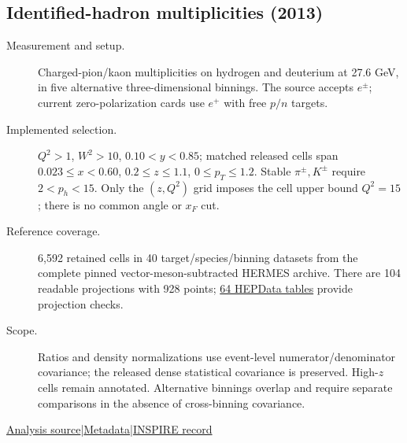 \documentclass[11pt,a4paper]{article}
\newcommand{\id}[1]{{\small\texttt{\detokenize{#1}}}}
\begin{document}
\subsection{\texorpdfstring{Identified-hadron multiplicities (2013)}{Identified-hadron multiplicities (2013)}}
\id{HERMES_2013_I1208547}\quad\cite{r1208547}
\begin{description}
\item[Measurement and setup.] Charged-pion/kaon multiplicities on hydrogen and deuterium at 27.6 GeV, in five alternative three-dimensional binnings. The source accepts $e^\pm$; current zero-polarization cards use $e^+$ with free $p/n$ targets.
\item[Implemented selection.] $Q^2>1$, $W^2>10$, $0.10<y<0.85$; matched released cells span $0.023\le x<0.60$, $0.2\le z\le1.1$, $0\le p_T\le1.2$. Stable $\pi^\pm,K^\pm$ require $2<p_h<15$. Only the $(z,Q^2)$ grid imposes the cell upper bound $Q^2=15$; there is no common angle or $x_F$ cut.
\item[Reference coverage.] 6,592 retained cells in 40 target/species/binning datasets from the complete pinned vector-meson-subtracted HERMES archive. There are 104 readable projections with 928 points; \href{https://doi.org/10.17182/hepdata.62097.v1}{64 HEPData tables} provide projection checks.
\item[Scope.] Ratios and density normalizations use event-level numerator/denominator covariance; the released dense statistical covariance is preserved. High-$z$ cells remain annotated. Alternative binnings overlap and require separate comparisons in the absence of cross-binning covariance.
\end{description}
{\small\href{https://github.com/apapaefs/HerwigPolarizedPheno/blob/105045bd757aaa6b217e87811dc5f9a22a8d1cef/analyses/rivet/dis/HERMES_2013_I1208547.cc}{Analysis source}\quad|\quad\href{https://github.com/apapaefs/HerwigPolarizedPheno/blob/105045bd757aaa6b217e87811dc5f9a22a8d1cef/analyses/rivet/dis/HERMES_2013_I1208547.info}{Metadata}\quad|\quad\href{https://inspirehep.net/literature/1208547}{INSPIRE record}}

\clearpage
{}
\end{document}
